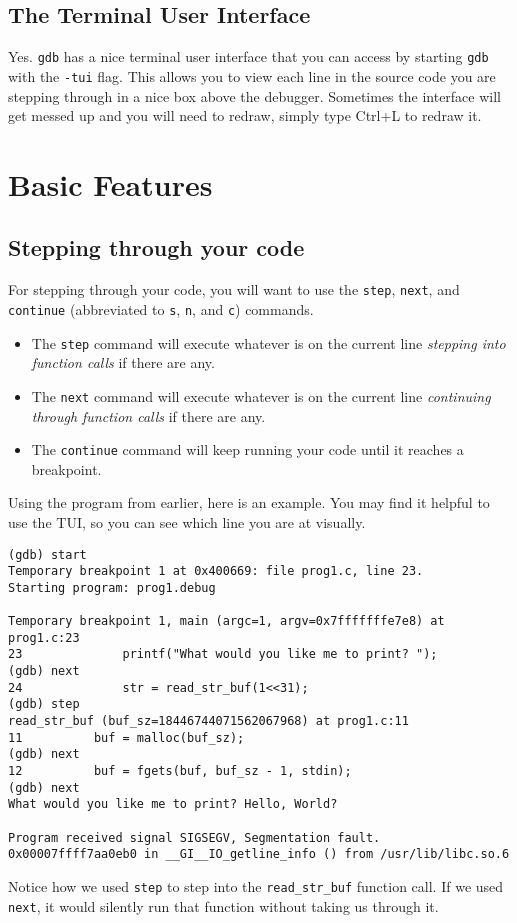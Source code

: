 \documentclass[11pt]{article}
\begin{document}
\subsection{The Terminal User Interface}
Yes. \texttt{gdb} has a nice terminal user interface that you can access by
starting \texttt{gdb} with the \texttt{-tui} flag. This allows you to view each
line in the source code you are stepping through in a nice box above the
debugger. Sometimes the interface will get messed up and you will need to
redraw, simply type Ctrl+L to redraw it.

\section{Basic Features}
\subsection{Stepping through your code}
For stepping through your code, you will want to use the \texttt{step},
\texttt{next}, and \texttt{continue} (abbreviated to \texttt{s}, \texttt{n},
and \texttt{c}) commands.

\begin{itemize}
    \item The \texttt{step} command will execute whatever is on the current line
        \emph{stepping into function calls} if there are any.
    \item The \texttt{next} command will execute whatever is on the current
        line \emph{continuing through function calls} if there are any.
    \item The \texttt{continue} command will keep running your code until it
        reaches a breakpoint.
\end{itemize}

Using the program from earlier, here is an example. You may find it
helpful to use the TUI, so you can see which line you are at visually.
\begin{termbox}
\begin{verbatim}
(gdb) start
Temporary breakpoint 1 at 0x400669: file prog1.c, line 23.
Starting program: prog1.debug

Temporary breakpoint 1, main (argc=1, argv=0x7fffffffe7e8) at prog1.c:23
23              printf("What would you like me to print? ");
(gdb) next
24              str = read_str_buf(1<<31);
(gdb) step
read_str_buf (buf_sz=18446744071562067968) at prog1.c:11
11          buf = malloc(buf_sz);
(gdb) next
12          buf = fgets(buf, buf_sz - 1, stdin);
(gdb) next
What would you like me to print? Hello, World?

Program received signal SIGSEGV, Segmentation fault.
0x00007ffff7aa0eb0 in __GI__IO_getline_info () from /usr/lib/libc.so.6
\end{verbatim}
\end{termbox}
Notice how we used \texttt{step} to step into the \texttt{read\_str\_buf}
function call. If we used \texttt{next}, it would silently run that function without
taking us through it.
\end{document}
